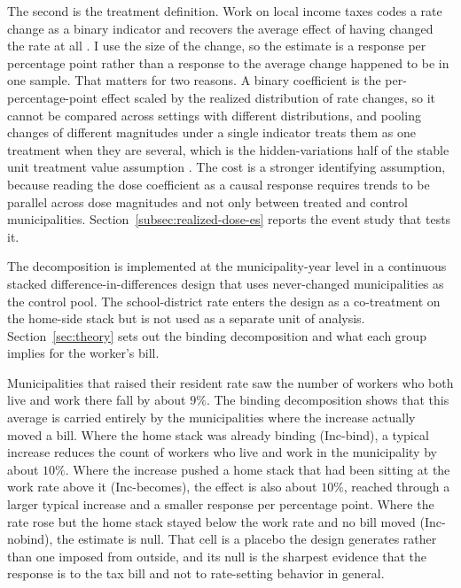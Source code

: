 \documentclass[12pt]{article}
\begin{document}
The second is the treatment definition. Work on local income taxes codes a rate change as a binary indicator and recovers the average effect of having changed the rate at all \citep{yangRESPONSIVENESSINCOMELOCAL2017, yushkovLocalIncomeTaxes2025}. I use the size of the change, so the estimate is a response per percentage point rather than a response to the average change happened to be in one sample. That matters for two reasons. A binary coefficient is the per-percentage-point effect scaled by the realized distribution of rate changes, so it cannot be compared across settings with different distributions, and pooling changes of different magnitudes under a single indicator treats them as one treatment when they are several, which is the hidden-variations half of the stable unit treatment value assumption \citep[ch.~1]{imbensCausalInferenceStatistics2015}. The cost is a stronger identifying assumption, because reading the dose coefficient as a causal response requires trends to be parallel across dose magnitudes and not only between treated and control municipalities. Section~\ref{subsec:realized-dose-es} reports the event study that tests it.

The decomposition is implemented at the municipality-year level in
a continuous stacked difference-in-differences design \citep{cengizEffectMinimumWages2019a} that uses
never-changed municipalities as the control pool. The
school-district rate enters the design as a co-treatment on the
home-side stack but is not used as a separate unit of analysis.
Section~\ref{sec:theory} sets out the binding decomposition and what
each group implies for the worker's bill.

Municipalities that raised their resident rate saw the number of workers who both live and work there fall by about $9\%$. The binding decomposition shows that this average is carried entirely by the municipalities where the increase actually moved a bill. Where the home stack was already binding (Inc-bind), a typical increase reduces the count of workers who live and work in the municipality by about $10\%$. Where the increase pushed a home stack that had been sitting at the work rate above it (Inc-becomes), the effect is also about $10\%$, reached through a larger typical increase and a smaller response per percentage point. Where the rate rose but the home stack stayed below the work rate and no bill moved (Inc-nobind), the estimate is null. That cell is a placebo the design generates rather than one imposed from outside, and its null is the sharpest evidence that the response is to the tax bill and not to rate-setting behavior in general.
\end{document}
